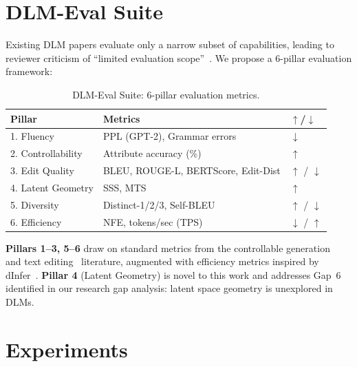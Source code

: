 \documentclass{article}
\begin{document}
\section{DLM-Eval Suite}
\label{sec:eval_suite}

Existing DLM papers evaluate only a narrow subset of capabilities, leading to reviewer criticism of ``limited evaluation scope''~\citep{zhou2025ccdd}.
We propose a 6-pillar evaluation framework:

\begin{table}[t]
\centering
\caption{DLM-Eval Suite: 6-pillar evaluation metrics.}
\label{tab:eval_suite}
\small
\begin{tabular}{lll}
\toprule
\textbf{Pillar} & \textbf{Metrics} & \textbf{$\uparrow$/$\downarrow$} \\
\midrule
1. Fluency & PPL (GPT-2), Grammar errors & $\downarrow$ \\
2. Controllability & Attribute accuracy (\%) & $\uparrow$ \\
3. Edit Quality & BLEU, ROUGE-L, BERTScore, Edit-Dist & $\uparrow$ / $\downarrow$ \\
4. Latent Geometry & SSS, MTS & $\uparrow$ \\
5. Diversity & Distinct-1/2/3, Self-BLEU & $\uparrow$ / $\downarrow$ \\
6. Efficiency & NFE, tokens/sec (TPS) & $\downarrow$ / $\uparrow$ \\
\bottomrule
\end{tabular}
\end{table}

\textbf{Pillars 1--3, 5--6} draw on standard metrics from the controllable generation~\citep{congenbench2024} and text editing~\citep{fang2024editeval} literature, augmented with efficiency metrics inspired by dInfer~\citep{dinfer2025}.
\textbf{Pillar 4} (Latent Geometry) is novel to this work and addresses Gap~6 identified in our research gap analysis: latent space geometry is unexplored in DLMs.

\section{Experiments}
\label{sec:experiments}
\end{document}
